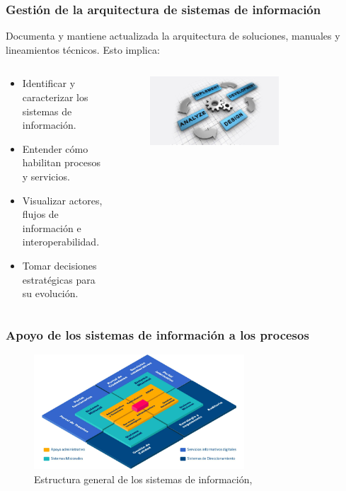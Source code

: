 \begin{frame}

  \frametitle{Gestión de la arquitectura de sistemas de información}

  Documenta y mantiene actualizada la arquitectura de soluciones, manuales y lineamientos técnicos. Esto implica:
  \begin{columns}
    \begin{column}{.5\textwidth}
      \begin{itemize}	
        \item Identificar y caracterizar los sistemas de información.
        \item Entender cómo habilitan procesos y servicios.
        \item Visualizar actores, flujos de información e interoperabilidad.
        \item Tomar decisiones estratégicas para su evolución.
      \end{itemize}
    \end{column}

    \begin{column}{.5\textwidth}
      \begin{figure}[ht]
        \centering
        \includegraphics[width=0.7\textwidth]{img/arquitectura.jpg}
      \end{figure}
    \end{column}
  \end{columns}


\end{frame} 

\begin{frame}
  \frametitle{Apoyo de los sistemas de información a los procesos}
  \begin{figure}[ht]
     \centering
     \includegraphics[width=0.7\textwidth]{img/procesos.png}
     \caption{\label{fig:procesos} Estructura general de los sistemas de información, \cite{MinTIC2021marco}}
  \end{figure}
\end{frame}
